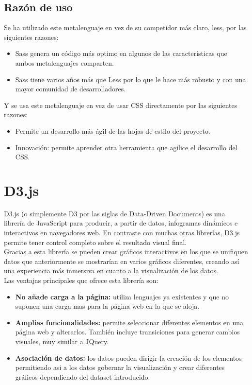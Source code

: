 
\subsection{Razón de uso}
Se ha utilizado este metalenguaje en vez de su competidor más claro, less, por las siguientes razones:

\begin{itemize}
	\item Sass genera un código más optimo en algunos de las características que ambos metalenguajes comparten.
	\item Sass tiene varios años más que Less por lo que le hace más robusto y con una mayor comunidad de desarrolladores.
\end{itemize}

Y se usa este metalenguaje en vez de usar CSS directamente por las siguientes razones:

\begin{itemize}
	\item Permite un desarrollo más ágil de las hojas de estilo del proyecto.
	\item Innovación: permite aprender otra herramienta que agilice el desarrollo del CSS.
\end{itemize}

\section{D3.js}
D3.js\cite{d3js} (o simplemente D3 por las siglas de Data-Driven Documents) es una librería de JavaScript para producir, a partir de datos, infogramas dinámicos e interactivos en navegadores web. En contraste con muchas otras librerías, D3.js permite tener control completo sobre el resultado visual final.\\

Gracias a esta librería se pueden crear gráficos interactivos en los que se unifiquen datos que anteriormente se mostrarían en varios gráficos diferentes, creando así una experiencia más inmersiva en cuanto a la visualización de los datos. \\

Las ventajas principales que ofrece esta librería son:
\begin{itemize}
	\item \textbf{No añade carga a la página:} utiliza lenguajes ya existentes y que no suponen una carga mas para la página web en la que se aloja.
	\item \textbf{Amplias funcionalidades:} permite seleccionar diferentes elementos en una página web y alterarlos. También incluye transiciones para generar cambios visuales, muy similar a JQuery.
	\item \textbf{Asociación de datos:} los datos pueden dirigir la creación de los elementos permitiendo asi a los datos gobernar la visualización y crear diferentes gráficos dependiendo del dataset introducido.
\end{itemize}

